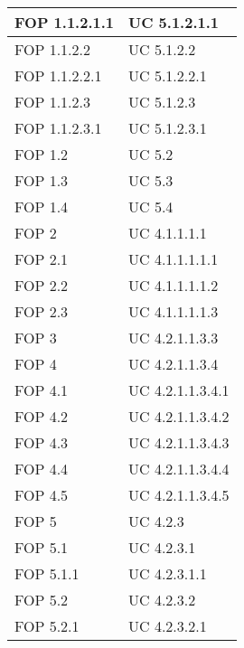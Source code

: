 \begin{longtable}{p{} p{}}
FOP 1.1.2.1.1 & UC 5.1.2.1.1\\
\midrule
FOP 1.1.2.2 & UC 5.1.2.2\\
\midrule
FOP 1.1.2.2.1 & UC 5.1.2.2.1\\
\midrule
FOP 1.1.2.3 & UC 5.1.2.3\\
\midrule
FOP 1.1.2.3.1 & UC 5.1.2.3.1\\
\midrule
FOP 1.2 & UC 5.2\\
\midrule
FOP 1.3 & UC 5.3\\
\midrule
FOP 1.4 & UC 5.4\\
\midrule
FOP 2 & UC 4.1.1.1.1\\
\midrule
FOP 2.1 & UC 4.1.1.1.1.1\\
\midrule
FOP 2.2 & UC 4.1.1.1.1.2\\
\midrule
FOP 2.3 & UC 4.1.1.1.1.3\\
\midrule
FOP 3 & UC 4.2.1.1.3.3\\
\midrule
FOP 4 & UC 4.2.1.1.3.4\\
\midrule
FOP 4.1 & UC 4.2.1.1.3.4.1\\
\midrule
FOP 4.2 & UC 4.2.1.1.3.4.2\\
\midrule
FOP 4.3 & UC 4.2.1.1.3.4.3\\
\midrule
FOP 4.4 & UC 4.2.1.1.3.4.4\\
\midrule
FOP 4.5 & UC 4.2.1.1.3.4.5\\
\midrule
FOP 5 & UC 4.2.3\\
\midrule
FOP 5.1 & UC 4.2.3.1\\
\midrule
FOP 5.1.1 & UC 4.2.3.1.1\\
\midrule
FOP 5.2 & UC 4.2.3.2\\
\midrule
FOP 5.2.1 & UC 4.2.3.2.1\\

\end{longtable}

\newpage

